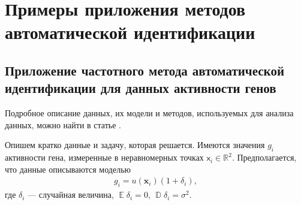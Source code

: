 \documentclass[specialist,
               substylefile = spbu.rtx,
               subf,href,colorlinks=true, 12pt]{disser}
\DeclareMathOperator{\D}{\mathbb{D}}
\def\E{\mathop{\mathbb{E}}}
\begin{document}
%





\chapter{Примеры приложения методов автоматической идентификации}
\label{sec:applications_gene}

\section{Приложение частотного метода автоматической идентификации для данных активности генов}

Подробное описание данных, их модели и методов, используемых для анализа данных, можно найти в статье \cite{Spisok2017}.

Опишем кратко данные и задачу, которая решается. Имеются значения $g_i$ активности гена, измеренные в неравномерных точках  $\mathsf{x}_i \in \mathbb{R}^2$.
Предполагается, что данные описываются моделью
\begin{eqnarray*}
g_i = u(\mathbf{x}_i)(1 + \delta_i),
\end{eqnarray*}
где $\delta_i$ --- случайная величина, $\E\delta_i=0$, $\D\delta_i=\sigma^2$.
\end{document}
